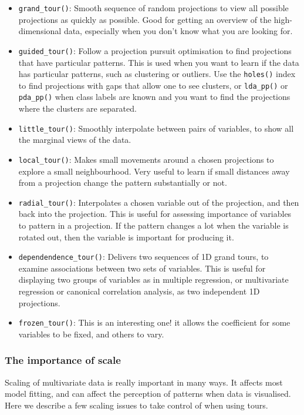 \documentclass[
  letterpaper,
]{krantz}
\providecommand{\tightlist}{%
  \setlength{\itemsep}{0pt}\setlength{\parskip}{0pt}}
\begin{document}
\begin{itemize}
\tightlist
\item
  \texttt{grand\_tour()}: Smooth sequence of random projections to view
  all possible projections as quickly as possible. Good for getting an
  overview of the high-dimensional data, especially when you don't know
  what you are looking for.
\item
  \texttt{guided\_tour()}: Follow a projection pursuit optimisation to
  find projections that have particular patterns. This is used when you
  want to learn if the data has particular patterns, such as clustering
  or outliers. Use the \texttt{holes()} index to find projections with
  gaps that allow one to see clusters, or \texttt{lda\_pp()} or
  \texttt{pda\_pp()} when class labels are known and you want to find
  the projections where the clusters are separated.
\item
  \texttt{little\_tour()}: Smoothly interpolate between pairs of
  variables, to show all the marginal views of the data.
\item
  \texttt{local\_tour()}: Makes small movements around a chosen
  projections to explore a small neighbourhood. Very useful to learn if
  small distances away from a projection change the pattern
  substantially or not.
\item
  \texttt{radial\_tour()}: Interpolates a chosen variable out of the
  projection, and then back into the projection. This is useful for
  assessing importance of variables to pattern in a projection. If the
  pattern changes a lot when the variable is rotated out, then the
  variable is important for producing it.
\item
  \texttt{dependendence\_tour()}: Delivers two sequences of 1D grand
  tours, to examine associations between two sets of variables. This is
  useful for displaying two groups of variables as in multiple
  regression, or multivariate regression or canonical correlation
  analysis, as two independent 1D projections.
\item
  \texttt{frozen\_tour()}: This is an interesting one! it allows the
  coefficient for some variables to be fixed, and others to vary.
\end{itemize}

\subsubsection{The importance of scale}\label{the-importance-of-scale}

Scaling of multivariate data is really important in many ways. It
affects most model fitting, and can affect the perception of patterns
when data is visualised. Here we describe a few scaling issues to take
control of when using tours.
\end{document}
